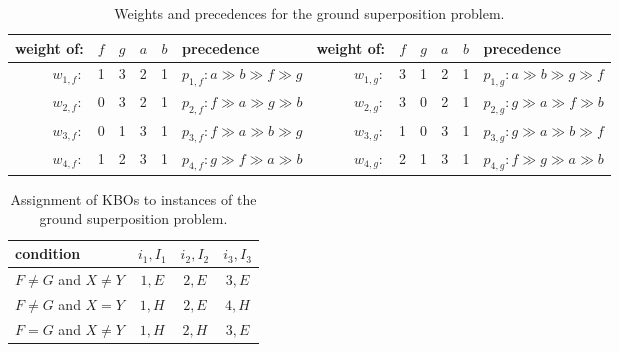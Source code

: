 
\begin{table}[t]
\begin{center}
\begin{tabular}{r@{\hskip 0.5em}c c c c@{\hskip 0.5em} |@{\hskip 0.5em} l@{\hskip 1em} ||@{\hskip 0.5em} r@{\hskip 0.5em} c c c c@{\hskip 0.5em} |@{\hskip 0.5em} l}
  weight of: & $f$ & $g$ & $a$ & $b$ & precedence
  & weight of: & $f$ & $g$ & $a$ & $b$ & precedence \\ \hline
  $w_{1,f}:$  & 1   & 3   & 2   & 1   & $p_{1,f}: a \gg b \gg f \gg g$ &
  $w_{1,g}:$  & 3   & 1   & 2   & 1   & $p_{1,g}: a \gg b \gg g \gg f$ \\ \hline
  $w_{2,f}:$  & 0   & 3   & 2   & 1   & $p_{2,f}: f \gg a \gg g \gg b$ &
  $w_{2,g}:$  & 3   & 0   & 2   & 1   & $p_{2,g}: g \gg a \gg f \gg b$ \\ \hline
  $w_{3,f}:$  & 0   & 1   & 3   & 1   & $p_{3,f}: f \gg a \gg b \gg g$ &
  $w_{3,g}:$  & 1   & 0   & 3   & 1   & $p_{3,g}: g \gg a \gg b \gg f$ \\ \hline
  $w_{4,f}:$  & 1   & 2   & 3   & 1   & $p_{4,f}: g \gg f \gg a \gg b$ &
  $w_{4,g}:$  & 2   & 1   & 3   & 1   & $p_{4,g}: f \gg g \gg a \gg b$ 
\end{tabular}
\hspace*{0.5em}
\caption{Weights and precedences for the ground superposition problem.}
\label{tab:ground-sup-wp}
\end{center}
\end{table}

\begin{table}[t]
\begin{center}
\begin{tabular}{l@{\hskip 1.05em} || c | c | c}
condition & $i_1, I_1$ & $i_2, I_2$ & $i_3, I_3$ \\ \hline
$F \not = G$ and $X \not= Y$ & $1,E$ & $2, E$ & $3, E$ \\
$F \not = G$ and $X = Y$ & $1, H$ & $2, E$ & $4, H$ \\
$F = G$ and $X \not= Y$ & $1, H$ & $2, H$ & $3, E$
\end{tabular}
\hspace*{0.5em}
\caption{Assignment of KBOs to instances of the ground superposition problem.}
\label{tab:ground-sup-as}
\end{center}
\end{table}

